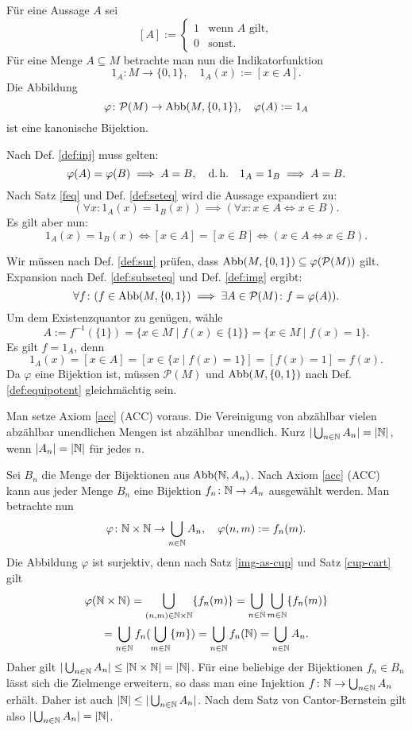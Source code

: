 \begin{Beweis}
Für eine Aussage $A$ sei
\[[A] := \begin{cases}
1&\text{wenn $A$ gilt},\\
0&\text{sonst}.
\end{cases}\]
Für eine Menge $A\subseteq M$ betrachte man nun die
Indikatorfunktion
\[1_A\colon M\to\{0,1\},\quad 1_A(x):=[x\in A].\]
Die Abbildung
\[\varphi\colon\mathcal P(M)\to\operatorname{Abb}(M,\{0,1\}),\quad \varphi(A):=1_A\]
ist eine kanonische Bijektion.

Nach Def. \ref{def:inj} muss gelten:
\[\varphi(A)=\varphi(B)\implies A=B,\quad\text{d.\,h.}\quad
1_A=1_B \implies A=B.\]
Nach Satz \ref{feq} und Def. \ref{def:seteq}
wird die Aussage expandiert zu:
\[(\forall x\colon 1_A(x)=1_B(x))\implies
(\forall x\colon x\in A\iff x\in B).\]
Es gilt aber nun:
\[1_A(x)=1_B(x)\iff [x\in A]=[x\in B] \iff (x\in A\iff x\in B).\]
\end{Beweis}
 Wir müssen nach Def. \ref{def:sur}
prüfen, dass $\operatorname{Abb}(M,\{0,1\})\subseteq \varphi(\mathcal P(M))$ gilt.
Expansion nach Def. \ref{def:subseteq} und Def. \ref{def:img} ergibt:
\[\forall f\colon (f\in\operatorname{Abb}(M,\{0,1\})\implies\exists A\in\mathcal P(M)\colon f=\varphi(A)).\]
Um dem Existenzquantor zu genügen, wähle
\[A := f^{-1}(\{1\}) = \{x\in M\mid f(x)\in \{1\}\} = \{x\in M\mid f(x)=1\}.\]
Es gilt $f=1_A$, denn
\[1_A(x) = [x\in A] = [x\in\{x\mid f(x)=1\}] = [f(x)=1] = f(x).\]
Da $\varphi$ eine Bijektion ist, müssen $\mathcal P(M)$ und $\operatorname{Abb}(M,\{0,1\})$
nach Def. \ref{def:equipotent} gleichmächtig
sein.\,\qedsymbol

\newpage
\begin{Satz}\label{countable-union-countable}
Man setze Axiom \ref{acc} (ACC) voraus.
Die Vereinigung von abzählbar vielen abzählbar unendlichen Mengen
ist abzählbar unendlich. Kurz $|\bigcup_{n\in\mathbb N} A_n| = |\mathbb N|$, wenn
$|A_n|=|\mathbb N|$ für jedes $n$.
\end{Satz}

\begin{Beweis}
Sei $B_n$ die Menge der Bijektionen aus $\operatorname{Abb}(\mathbb N,A_n)$. 
Nach Axiom \ref{acc} (ACC) kann aus jeder Menge $B_n$
eine Bijektion $f_n\colon\mathbb N\to A_n$ ausgewählt werden.
Man betrachte nun
\[\varphi\colon\mathbb N\times\mathbb N\to\bigcup_{n\in\mathbb N} A_n,\quad
\varphi(n,m):=f_n(m).\]
Die Abbildung $\varphi$ ist surjektiv, denn nach
Satz \ref{img-as-cup} und Satz \ref{cup-cart} gilt
\begin{gather*}
\varphi(\mathbb N\times\mathbb N) = \bigcup_{(n,m)\in\mathbb N{\times}\mathbb N} \{f_n(m)\}
= \bigcup_{n\in\mathbb N}\bigcup_{m\in\mathbb N} \{f_n(m)\}\\
= \bigcup_{n\in\mathbb N} f_n(\bigcup_{m\in\mathbb N} \{m\})
= \bigcup_{n\in\mathbb N} f_n(\mathbb N) = \bigcup_{n\in\mathbb N} A_n.
\end{gather*}
Daher gilt $|\bigcup_{n\in\mathbb N} A_n|\le |\mathbb N\times \mathbb N| = |\mathbb N|$.
Für eine beliebige der Bijektionen $f_n\in B_n$ lässt sich die Zielmenge
erweitern, so dass man eine Injektion $f\colon\mathbb N\to\bigcup_{n\in\mathbb N} A_n$
erhält. Daher ist auch $|\mathbb N|\le |\bigcup_{n\in\mathbb N} A_n|$. Nach dem
Satz von Cantor-Bernstein gilt also
$|\bigcup_{n\in\mathbb N} A_n|=|\mathbb N|$.\,\qedsymbol
\end{Beweis}

